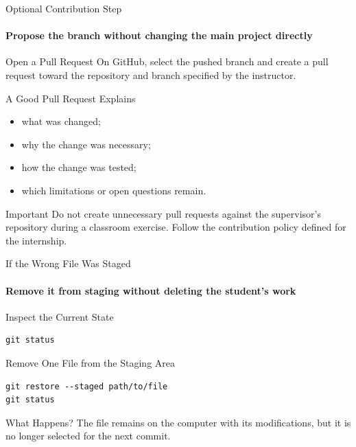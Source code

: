 \begin{frame}{Optional Contribution Step}
\framesubtitle{Propose the branch without changing the main project directly}

\footnotesize

\begin{block}{Open a Pull Request}
On GitHub, select the pushed branch and create a pull request toward the
repository and branch specified by the instructor.
\end{block}

\begin{exampleblock}{A Good Pull Request Explains}
\begin{itemize}
    \setlength{\itemsep}{0.20em}
    \item what was changed;
    \item why the change was necessary;
    \item how the change was tested;
    \item which limitations or open questions remain.
\end{itemize}
\end{exampleblock}

\begin{alertblock}{Important}
Do not create unnecessary pull requests against the supervisor's
repository during a classroom exercise. Follow the contribution policy
defined for the internship.
\end{alertblock}

\end{frame}

\begin{frame}[fragile]{If the Wrong File Was Staged}
\framesubtitle{Remove it from staging without deleting the student's work}

\footnotesize

\begin{block}{Inspect the Current State}
\begin{verbatim}
git status
\end{verbatim}
\end{block}

\begin{exampleblock}{Remove One File from the Staging Area}
\begin{verbatim}
git restore --staged path/to/file
git status
\end{verbatim}
\end{exampleblock}

\begin{block}{What Happens?}
The file remains on the computer with its modifications, but it is no
longer selected for the next commit.
\end{block}


\end{frame}

